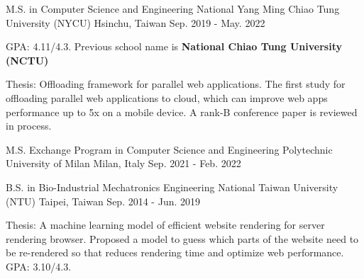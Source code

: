 
\vspace{-2mm}

\begin{cventries}

  
\cventry
  {M.S. in Computer Science and Engineering} %
  {National Yang Ming Chiao Tung University (NYCU)} %
  {Hsinchu, Taiwan} %
  {Sep. 2019 - May. 2022} %
  {
    \begin{cvitems} %
      \item {GPA: 4.11/4.3. Previous school name is \textbf{National Chiao Tung University (NCTU)}}
      \item {Thesis: Offloading framework for parallel web applications.
        The first study for offloading parallel web applications to cloud,
        which can improve web apps performance up to 5x on a mobile device.
        A rank-B conference paper is reviewed in process.
      }
    \end{cvitems}
  }

  \vspace{-3mm}

\cventry
    {M.S. Exchange Program in Computer Science and Engineering} %
    {Polytechnic University of Milan} %
    {Milan, Italy} %
    {Sep. 2021 - Feb. 2022} %
    {}

  \vspace{-6mm}

  \cventry
    {B.S. in Bio-Industrial Mechatronics Engineering} %
    {National Taiwan University (NTU)} %
    {Taipei, Taiwan} %
    {Sep. 2014 - Jun. 2019} %
    {
      \begin{cvitems} %
        \item {Thesis: A machine learning model of efficient website rendering for server rendering browser.
          Proposed a model to guess which parts of the website need to be re-rendered so that reduces rendering time
          and optimize web performance. GPA: 3.10/4.3. 
        }
      \end{cvitems}
    }

\end{cventries}
